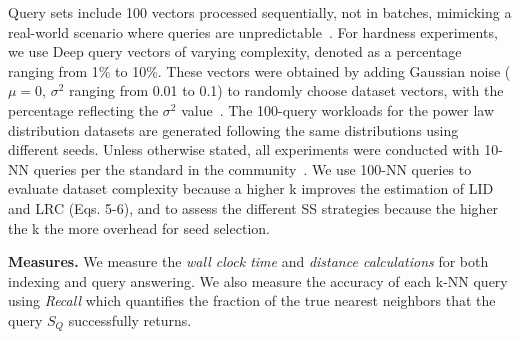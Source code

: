 
  Query sets include 100 vectors processed sequentially, not in batches, mimicking a real-world scenario where queries are unpredictable~\cite{itsawreport,DBLP:conf/edbt/GogolouTPB19,conf/sigmod/gogolou20}. 
For hardness experiments, we use Deep query vectors of varying complexity, denoted as a percentage ranging from 1\% to 10\%. These vectors were obtained by adding Gaussian noise (\(\mu = 0\), \(\sigma^2\) ranging from 0.01 to 0.1) to randomly choose dataset vectors, with the percentage reflecting the \(\sigma^2\) value~\cite{johannesjoural2018}.
The 100-query workloads for the power law distribution datasets are generated following the same distributions using different seeds. %
Unless otherwise stated, all experiments were conducted with 10-NN queries per the standard in the community~\cite{neurips-2021-ann-competition,url/Elpis,aumuller2017ann}.
We use 100-NN queries to evaluate dataset complexity because a higher k improves the estimation of LID and LRC (Eqs. 5-6), and to assess the different SS strategies because the higher the k the more overhead for seed selection.

\noindent\textbf{Measures.} We measure %
the {\it wall clock time} and {\it distance calculations} for both indexing and query answering. We also measure the accuracy of each k-NN query using {\it Recall} which quantifies the fraction of the true nearest neighbors that the query $S_Q$ successfully returns.  

